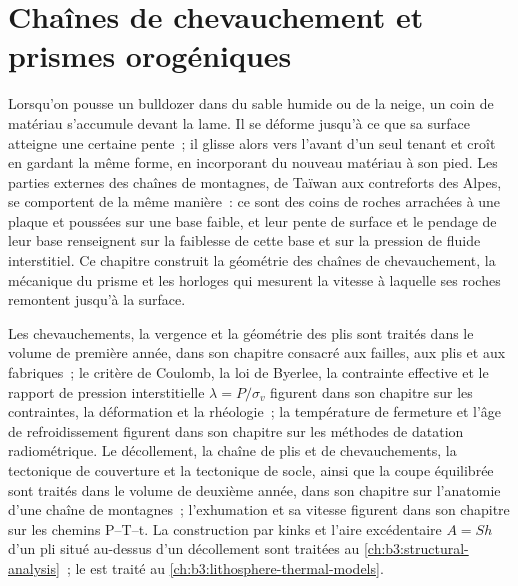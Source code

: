\chapter{Chaînes de chevauchement et prismes orogéniques}\label{ch:b3:orogenic-wedges}

Lorsqu'on pousse un bulldozer dans du sable humide ou de la neige, un coin de matériau
s'accumule devant la lame. Il se déforme jusqu'à ce que sa surface atteigne une certaine pente~;
il glisse alors vers l'avant d'un seul tenant et croît en gardant la même forme,
en incorporant du nouveau matériau à son pied. Les parties externes des chaînes de montagnes, de
Taïwan aux contreforts des Alpes, se comportent de la même manière~: ce sont des coins de roches
arrachées à une plaque et poussées sur une base faible, et leur pente de surface
et le pendage de leur base renseignent sur la faiblesse de cette base et sur la
pression de fluide interstitiel. Ce chapitre construit la géométrie des chaînes
de chevauchement, la mécanique du prisme et les horloges qui mesurent la vitesse
à laquelle ses roches remontent jusqu'à la surface.

\begin{recall}
Les chevauchements, la vergence et la géométrie des plis sont traités dans le volume de première année, dans son chapitre
consacré aux failles, aux plis et aux fabriques~; le critère de Coulomb, la loi de Byerlee, la
contrainte effective et le rapport de pression interstitielle $\lambda = P/\sigma_v$ figurent dans son
chapitre sur les contraintes, la déformation et la rhéologie~; la température de fermeture et
l'âge de refroidissement figurent dans son chapitre sur les méthodes de datation radiométrique. Le décollement, la
chaîne de plis et de chevauchements, la tectonique de couverture et la tectonique de socle, ainsi que la
coupe équilibrée sont traités dans le volume de deuxième année, dans son chapitre
sur l'anatomie d'une chaîne de montagnes~; l'exhumation et sa vitesse figurent dans son chapitre sur les
chemins P--T--t. La construction par kinks et l'aire excédentaire $A = Sh$ d'un pli situé
au-dessus d'un décollement sont traitées au \cref{ch:b3:structural-analysis}~; le 
est traité au \cref{ch:b3:lithosphere-thermal-models}.
\end{recall}

